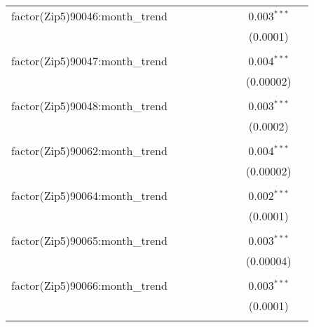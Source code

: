 \begin{table}[H]
{\begin{tabular}{@{\extracolsep{5pt}}lcccccccc}
  factor(Zip5)90046:month\_trend &  &  &  &  &  &  & 0.003$^{***}$ &  \\  

   &  &  &  &  &  &  & (0.0001) &  \\  

   & & & & & & & & \\  

  factor(Zip5)90047:month\_trend &  &  &  &  &  &  & 0.004$^{***}$ &  \\  

   &  &  &  &  &  &  & (0.00002) &  \\  

   & & & & & & & & \\  

  factor(Zip5)90048:month\_trend &  &  &  &  &  &  & 0.003$^{***}$ &  \\  

   &  &  &  &  &  &  & (0.0002) &  \\  

   & & & & & & & & \\  

  factor(Zip5)90062:month\_trend &  &  &  &  &  &  & 0.004$^{***}$ &  \\  

   &  &  &  &  &  &  & (0.00002) &  \\  

   & & & & & & & & \\  

  factor(Zip5)90064:month\_trend &  &  &  &  &  &  & 0.002$^{***}$ &  \\  

   &  &  &  &  &  &  & (0.0001) &  \\  

   & & & & & & & & \\  

  factor(Zip5)90065:month\_trend &  &  &  &  &  &  & 0.003$^{***}$ &  \\  

   &  &  &  &  &  &  & (0.00004) &  \\  

   & & & & & & & & \\  

  factor(Zip5)90066:month\_trend &  &  &  &  &  &  & 0.003$^{***}$ &  \\  

   &  &  &  &  &  &  & (0.0001) &  \\  

   & & & & & & & & \\  


\end{tabular}}
\end{table}
